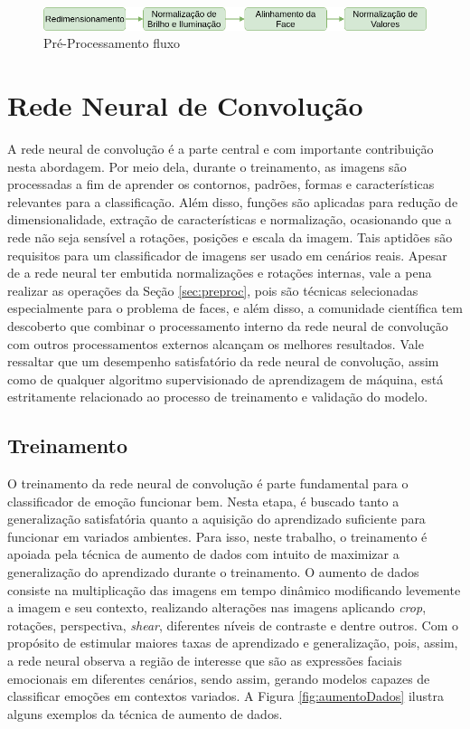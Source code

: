 \begin{figure}
\centering
\includegraphics[scale=0.5]{figuras/PreProcessamentoMestrado.png}
\caption{Pré-Processamento fluxo}
\label{fig:preprocessingfluxo}
\end{figure}



\section{Rede Neural de Convolução}\label{sec:redeneu}
A rede neural de convolução é a parte central e com importante contribuição nesta abordagem. Por meio dela, durante o treinamento, as imagens são processadas a fim de aprender os contornos, padrões, formas e características relevantes para a classificação. Além disso, funções são aplicadas para redução de dimensionalidade, extração de características e normalização, ocasionando que a rede não seja sensível a rotações, posições e escala da imagem. Tais aptidões são requisitos para um classificador de imagens ser usado em cenários reais. Apesar de a rede neural ter embutida normalizações e rotações internas, vale a pena realizar as operações da Seção \ref{sec:preproc}, pois são técnicas selecionadas especialmente para o problema de faces, e além disso, a comunidade científica tem descoberto que combinar o processamento interno da rede neural de convolução com outros processamentos externos alcançam os melhores resultados. Vale ressaltar que um desempenho satisfatório da rede neural de convolução, assim como de qualquer algoritmo supervisionado de aprendizagem de máquina, está estritamente relacionado ao processo de treinamento e validação do modelo.    

\subsection{Treinamento}
O treinamento da rede neural de convolução é parte fundamental para o classificador de emoção funcionar bem. Nesta etapa, é buscado tanto a generalização satisfatória quanto a aquisição do aprendizado suficiente para funcionar em variados ambientes. Para isso, neste trabalho, o treinamento é apoiada pela técnica de aumento de dados com intuito de maximizar a generalização do aprendizado durante o treinamento. O aumento de dados consiste na multiplicação das imagens em tempo dinâmico modificando levemente a imagem e seu contexto, realizando alterações nas imagens aplicando \textit{crop}, rotações, perspectiva, \textit{shear}, diferentes níveis de contraste e dentre outros. Com o propósito de estimular maiores taxas de aprendizado e generalização, pois, assim, a rede neural observa a região de interesse que são as expressões faciais emocionais em diferentes cenários, sendo assim, gerando modelos capazes de classificar emoções em contextos variados. A Figura \ref{fig:aumentoDados} ilustra alguns exemplos da técnica de aumento de dados.


